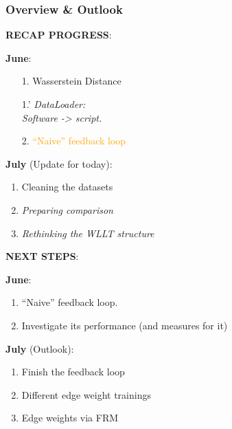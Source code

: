 \begin{frame}
	\frametitle{Overview \& Outlook} \vspace{-1cm}
	\begin{minipage}{0.45\textwidth}
		\textbf{RECAP PROGRESS}:\newline
				
		\textbf{June}:
		\begin{enumerate}
			\item[1.] Wasserstein Distance
			\item[1.'] \textit{DataLoader:\\Software -> script.}
			\item[2.] \textcolor{orange}{\enquote{Naive} feedback loop} \newline
		\end{enumerate}
	
		\textbf{July} (Update for today):
		\begin{enumerate}
			\item Cleaning the datasets
			\item \textit{Preparing comparison}
			\item \textit{Rethinking the WLLT structure}
			\newline
		\end{enumerate}
	\end{minipage}
	\begin{minipage}{0.45\textwidth}
		\textbf{NEXT STEPS}:\newline		
		
		\textbf{June}:
		\begin{enumerate}
			\item \enquote{Naive} feedback loop.
			\item Investigate its performance (and measures for it)
			\newline
			\item[]
		\end{enumerate}		
		
		\textbf{July} (Outlook):
		\begin{enumerate}
			\item Finish the feedback loop
			\item Different edge weight trainings
			\item Edge weights via FRM
			\newline
		\end{enumerate}
	\end{minipage}
\end{frame}

